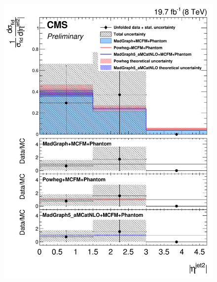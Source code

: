 \begin{figure}[hbtp]
  \begin{center}
    \includegraphics[width=\cmsFigWidth]{Figures/DiffCrossSecZZTo4mEtaJet2_Unfolded_fr_MadGraph_norm.png}     

\end{center}
\end{figure}
